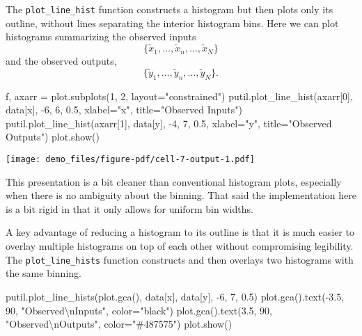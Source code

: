 \documentclass[
  letterpaper,
  DIV=11,
  numbers=noendperiod]{scrartcl}
\newenvironment{Shaded}{\begin{snugshade}}{\end{snugshade}}
\newcommand{\CharTok}[1]{\textcolor[rgb]{0.13,0.47,0.30}{#1}}
\newcommand{\DecValTok}[1]{\textcolor[rgb]{0.68,0.00,0.00}{#1}}
\newcommand{\FloatTok}[1]{\textcolor[rgb]{0.68,0.00,0.00}{#1}}
\newcommand{\NormalTok}[1]{\textcolor[rgb]{0.00,0.23,0.31}{#1}}
\newcommand{\OperatorTok}[1]{\textcolor[rgb]{0.37,0.37,0.37}{#1}}
\newcommand{\StringTok}[1]{\textcolor[rgb]{0.13,0.47,0.30}{#1}}
\begin{document}
The \texttt{plot\_line\_hist} function constructs a histogram but then
plots only its outline, without lines separating the interior histogram
bins. Here we can plot histograms summarizing the observed inputs \[
\{ \tilde{x}_{1}, \ldots, \tilde{x}_{n}, \ldots, \tilde{x}_{N} \}
\] and the observed outputs, \[
\{ \tilde{y}_{1}, \ldots, \tilde{y}_{n}, \ldots, \tilde{y}_{N} \}.
\]

\begin{Shaded}
\begin{Highlighting}[]
\NormalTok{f, axarr }\OperatorTok{=}\NormalTok{ plot.subplots(}\DecValTok{1}\NormalTok{, }\DecValTok{2}\NormalTok{, layout}\OperatorTok{=}\StringTok{"constrained"}\NormalTok{)}
\NormalTok{putil.plot\_line\_hist(axarr[}\DecValTok{0}\NormalTok{], data[}\StringTok{\textquotesingle{}x\textquotesingle{}}\NormalTok{], }\OperatorTok{{-}}\DecValTok{6}\NormalTok{, }\DecValTok{6}\NormalTok{, }\FloatTok{0.5}\NormalTok{,}
\NormalTok{                     xlabel}\OperatorTok{=}\StringTok{"x"}\NormalTok{, title}\OperatorTok{=}\StringTok{"Observed Inputs"}\NormalTok{)}
\NormalTok{putil.plot\_line\_hist(axarr[}\DecValTok{1}\NormalTok{], data[}\StringTok{\textquotesingle{}y\textquotesingle{}}\NormalTok{], }\OperatorTok{{-}}\DecValTok{4}\NormalTok{, }\DecValTok{7}\NormalTok{, }\FloatTok{0.5}\NormalTok{,}
\NormalTok{                     xlabel}\OperatorTok{=}\StringTok{"y"}\NormalTok{, title}\OperatorTok{=}\StringTok{"Observed Outputs"}\NormalTok{)}
\NormalTok{plot.show()}
\end{Highlighting}
\end{Shaded}

\texttt{[image: demo\_files/figure-pdf/cell-7-output-1.pdf]}

This presentation is a bit cleaner than conventional histogram plots,
especially when there is no ambiguity about the binning. That said the
implementation here is a bit rigid in that it only allows for uniform
bin widths.

A key advantage of reducing a histogram to its outline is that it is
much easier to overlay multiple histograms on top of each other without
compromising legibility. The \texttt{plot\_line\_hists} function
constructs and then overlays two histograms with the same binning.

\begin{Shaded}
\begin{Highlighting}[]
\NormalTok{putil.plot\_line\_hists(plot.gca(), data[}\StringTok{\textquotesingle{}x\textquotesingle{}}\NormalTok{], data[}\StringTok{\textquotesingle{}y\textquotesingle{}}\NormalTok{], }\OperatorTok{{-}}\DecValTok{6}\NormalTok{, }\DecValTok{7}\NormalTok{, }\FloatTok{0.5}\NormalTok{)}
\NormalTok{plot.gca().text(}\OperatorTok{{-}}\FloatTok{3.5}\NormalTok{, }\DecValTok{90}\NormalTok{, }\StringTok{"Observed}\CharTok{\textbackslash{}n}\StringTok{Inputs"}\NormalTok{, color}\OperatorTok{=}\StringTok{"black"}\NormalTok{)}
\NormalTok{plot.gca().text(}\FloatTok{3.5}\NormalTok{, }\DecValTok{90}\NormalTok{, }\StringTok{"Observed}\CharTok{\textbackslash{}n}\StringTok{Outputs"}\NormalTok{, color}\OperatorTok{=}\StringTok{"\#487575"}\NormalTok{)}
\NormalTok{plot.show()}
\end{Highlighting}
\end{Shaded}
\end{document}
